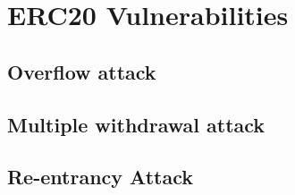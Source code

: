 
\section{ERC20 Vulnerabilities}
\label{sect:vul}

\subsection{Overflow attack}
\label{sect:overflow}


\subsection{Multiple withdrawal attack}
\label{sect:withdrawal}


\subsection{Re-entrancy Attack}
\label{sect:reentrancy}

